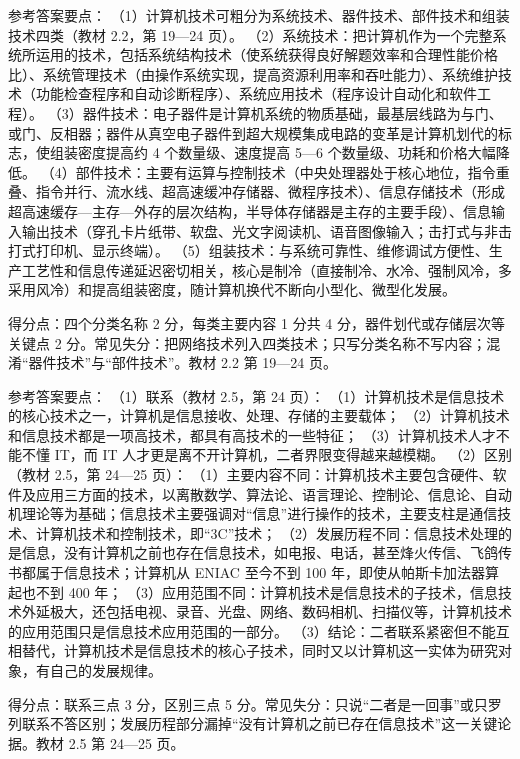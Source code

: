 \documentclass[a4paper,11pt]{article}
\begin{document}
\q 参考答案要点：
（1）计算机技术可粗分为系统技术、器件技术、部件技术和组装技术四类（教材 2.2，第 19—24 页）。
（2）系统技术：把计算机作为一个完整系统所运用的技术，包括系统结构技术（使系统获得良好解题效率和合理性能价格比）、系统管理技术（由操作系统实现，提高资源利用率和吞吐能力）、系统维护技术（功能检查程序和自动诊断程序）、系统应用技术（程序设计自动化和软件工程）。
（3）器件技术：电子器件是计算机系统的物质基础，最基层线路为与门、或门、反相器；器件从真空电子器件到超大规模集成电路的变革是计算机划代的标志，使组装密度提高约 4 个数量级、速度提高 5—6 个数量级、功耗和价格大幅降低。
（4）部件技术：主要有运算与控制技术（中央处理器处于核心地位，指令重叠、指令并行、流水线、超高速缓冲存储器、微程序技术）、信息存储技术（形成超高速缓存—主存—外存的层次结构，半导体存储器是主存的主要手段）、信息输入输出技术（穿孔卡片纸带、软盘、光文字阅读机、语音图像输入；击打式与非击打式打印机、显示终端）。
（5）组装技术：与系统可靠性、维修调试方便性、生产工艺性和信息传递延迟密切相关，核心是制冷（直接制冷、水冷、强制风冷，多采用风冷）和提高组装密度，随计算机换代不断向小型化、微型化发展。
\begin{analysis}得分点：四个分类名称 2 分，每类主要内容 1 分共 4 分，器件划代或存储层次等关键点 2 分。常见失分：把网络技术列入四类技术；只写分类名称不写内容；混淆“器件技术”与“部件技术”。教材 2.2 第 19—24 页。\end{analysis}

\q 参考答案要点：
（1）联系（教材 2.5，第 24 页）：
（1）计算机技术是信息技术的核心技术之一，计算机是信息接收、处理、存储的主要载体；
（2）计算机技术和信息技术都是一项高技术，都具有高技术的一些特征；
（3）计算机技术人才不能不懂 IT，而 IT 人才更是离不开计算机，二者界限变得越来越模糊。
（2）区别（教材 2.5，第 24—25 页）：
（1）主要内容不同：计算机技术主要包含硬件、软件及应用三方面的技术，以离散数学、算法论、语言理论、控制论、信息论、自动机理论等为基础；信息技术主要强调对“信息”进行操作的技术，主要支柱是通信技术、计算机技术和控制技术，即“3C”技术；
（2）发展历程不同：信息技术处理的是信息，没有计算机之前也存在信息技术，如电报、电话，甚至烽火传信、飞鸽传书都属于信息技术；计算机从 ENIAC 至今不到 100 年，即使从帕斯卡加法器算起也不到 400 年；
（3）应用范围不同：计算机技术是信息技术的子技术，信息技术外延极大，还包括电视、录音、光盘、网络、数码相机、扫描仪等，计算机技术的应用范围只是信息技术应用范围的一部分。
（3）结论：二者联系紧密但不能互相替代，计算机技术是信息技术的核心子技术，同时又以计算机这一实体为研究对象，有自己的发展规律。
\begin{analysis}得分点：联系三点 3 分，区别三点 5 分。常见失分：只说“二者是一回事”或只罗列联系不答区别；发展历程部分漏掉“没有计算机之前已存在信息技术”这一关键论据。教材 2.5 第 24—25 页。\end{analysis}
\end{document}
